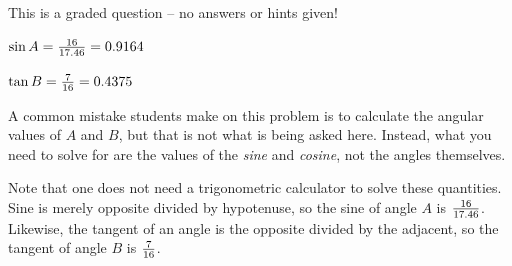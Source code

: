 \vfil 

\eject






This is a graded question -- no answers or hints given!
 






$\sin A = {16 \over 17.46} = 0.9164$

\vskip 10pt

$\tan B = {7 \over 16} = 0.4375$

\vskip 10pt

A common mistake students make on this problem is to calculate the angular values of $A$ and $B$, but that is not what is being asked here.  Instead, what you need to solve for are the values of the {\it sine} and {\it cosine}, not the angles themselves.

Note that one does not need a trigonometric calculator to solve these quantities.  Sine is merely opposite divided by hypotenuse, so the sine of angle $A$ is ${16 \over 17.46}$.  Likewise, the tangent of an angle is the opposite divided by the adjacent, so the tangent of angle $B$ is ${7 \over 16}$.




